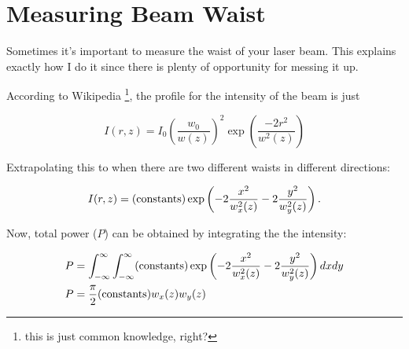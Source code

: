 




%

\chapter{Measuring Beam Waist}
\label{app:BelongInApp}

Sometimes it's important to measure the waist of your laser beam. This explains exactly how I do it since there is plenty of opportunity for messing it up. 
  
According to Wikipedia \footnote{this is just common knowledge, right?}, the profile for the intensity of the beam is just 

\begin{equation} \label{electricFieldExplicitForm}
I(r,z)=I_0\left(\frac{w_0}{w(z)}\right)^2 \exp \left(\frac{-2 r^2}{w^2(z)}\right)
\end{equation}

Extrapolating this to when there are two different waists in different directions: 

\begin{equation}
I(r,z)= ({\rm constants})\exp \left(-2\frac{x^2}{w_x^2(z)}-2\frac{y^2}{w_y^2(z)}\right) . 
\end{equation}

Now, total power ($P$) can be obtained by integrating the the intensity: 

\begin{align}
P&=\int_{-\infty}^{\infty}\int_{-\infty}^{\infty} ({\rm constants}) \exp \left(-2\frac{x^2}{w_x^2(z)}-2\frac{y^2}{w_y^2(z)}\right) dx dy\\
P&=\frac{\pi}{2} ({\rm constants}) w_x(z) w_y(z)
\end{align}

